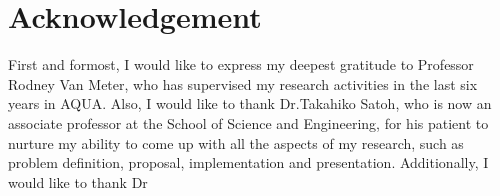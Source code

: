 \chapter*{Acknowledgement}
\label{acknowledgement}

First and formost, I would like to express my deepest gratitude to Professor Rodney Van Meter, who has supervised my research activities in the last six years in AQUA.
Also, I would like to thank Dr.Takahiko Satoh, who is now an associate professor at the School of Science and Engineering, for his patient to nurture my ability to come up with all the aspects of my research, such as problem definition, proposal, implementation and presentation.
Additionally, I would like to thank Dr






